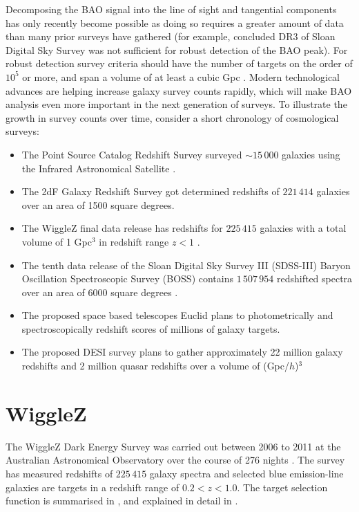 \documentclass[titlesmallcaps, examinerscopy, copyrightpage]{uqthesis}
\begin{document}
Decomposing the BAO signal into the line of sight and tangential components has only recently become possible as doing so requires a greater amount of data than many prior surveys have gathered (for example, \citet{OkumuraMatsubara2008} concluded DR3 of Sloan Digital Sky Survey was not sufficient for robust detection of the BAO peak). For robust detection survey criteria should have the number of targets on the order of $10^5$ or more, and span a volume of at least a cubic Gpc \citep{Tegmark1997,BlakeGlazebrook2003,BlakeParkinson2006}. Modern technological advances are helping increase galaxy survey counts rapidly, which will make BAO analysis even more important in the next generation of surveys. To illustrate the growth in survey counts over time, consider a short chronology of cosmological surveys:
\begin{itemize}
\item The Point Source Catalog Redshift Survey surveyed $\sim 15\,000$ galaxies using the Infrared Astronomical Satellite \citep{SaundersSutherland2000}.
\item The 2dF Galaxy Redshift Survey got determined redshifts of $221\,414$ galaxies \citep{CollessPeterson2003} over an area of 1500 square degrees.
\item The WiggleZ final data release has redshifts for $225\,415$ galaxies with a total volume of 1 Gpc$^3$ in redshift range $z < 1$ \citep{Drinkwater2010, Parkinson2012}.
\item The tenth data release of the Sloan Digital Sky Survey III (SDSS-III) Baryon Oscillation Spectroscopic Survey (BOSS) contains $1\,507\,954$ redshifted spectra over an area of 6000 square degrees \citep{AhnAlexandroff2014}.
\item The proposed space based telescopes Euclid plans to photometrically and spectroscopically redshift scores of millions of galaxy targets\citep{CimattiRobberto2009,WangPercival2010}.
\item The proposed DESI survey plans to gather approximately 22 million galaxy redshifts and 2 million quasar redshifts over a volume of (Gpc/$h$)$^3$ \citep{LeviBebek2013}
\end{itemize}






\section{WiggleZ} \label{sec:wigglez}

The WiggleZ Dark Energy Survey was carried out between 2006 to 2011 at the Australian Astronomical Observatory over the course of 276 nights \citep{Drinkwater2010}. The survey has measured redshifts of $225\,415$ galaxy spectra and selected blue emission-line galaxies are targets in a redshift range of $0.2 < z < 1.0$. The target selection function is summarised in \citet{BlakeDavis2011}, and explained in detail in \citet{BlakeBrough2010}. 
\end{document}
